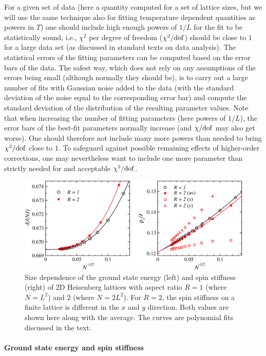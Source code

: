 \documentclass[draft,numberedheadings]{aipproc}
\begin{document}
For a given set of data (here a quantity computed for a set of lattice sizes, but we will use the same technique also for fitting temperature dependent 
quantities as powers in $T$) one should include high enough powers of $1/L$ for the fit to be statistically sound, i.e., $\chi^2$ per degree of freedom 
($\chi^2/{\rm dof}$) should be close to $1$ for a large data set (as discussed in standard texts on data analysis). The statistical errors of the fitting 
parameters can be computed based on the error bars of the data. The safest way, which does not rely on any assumptions of the errors being small (although 
normally they should be), is to carry out a large number of fits with Gaussian noise added to the data (with the standard deviation of the noise equal 
to the corresponding error bar) and compute the standard deviation of the distribution of the resulting parameter values. Note that when increasing the 
number of fitting parameters (here powers of $1/L$), the error bars of the best-fit parameters normally increase (and $\chi/{\rm dof}$ may also get worse). 
One should therefore not include many more powers than needed to bring $\chi^2/{\rm dof}$ close to $1$. To safeguard against possible remaining effects of 
higher-order corrections, one may nevertheless want to include one more parameter than strictly needed for and acceptable $\chi^2/{\rm dof}$.

\begin{figure}
\includegraphics[width=13.5cm, clip]{ewhb2d.eps}
\caption{Size dependence of the ground state energy (left) and spin stiffness (right) of 2D Heisenberg lattices with aspect ratio $R=1$ (where $N=L^2$) and 
$2$ (where $N=2L^2$). For $R=2$, the spin stiffness on a finite lattice is different in the $x$ and $y$ direction. Both values are shown here along with the 
average. The curves are polynomial fits discussed in the text.}
\label{ewhb2d}
\end{figure}

\paragraph{Ground state energy and spin stiffness}
\end{document}
